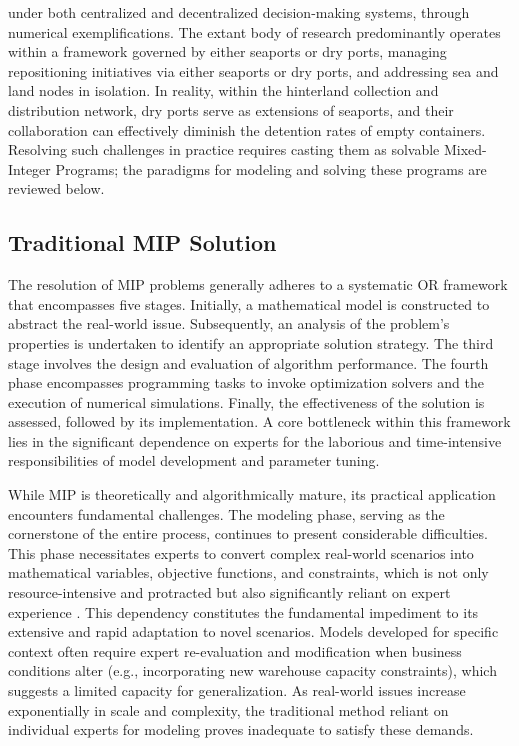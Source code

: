 \documentclass[preprint,12pt]{elsarticle}
\begin{document}
under both centralized and decentralized decision-making systems, through numerical exemplifications. The extant body of research predominantly operates within a framework governed by either seaports or dry ports, managing repositioning initiatives via either seaports or dry ports, and addressing sea and land nodes in isolation. In reality, within the hinterland collection and distribution network, dry ports serve as extensions of seaports, and their collaboration can effectively diminish the detention rates of empty containers. Resolving such challenges in practice requires casting them as solvable Mixed-Integer Programs; the paradigms for modeling and solving these programs are reviewed below.

\subsection{Traditional MIP Solution}
The resolution of MIP problems generally adheres to a systematic OR framework that encompasses five stages. Initially, a mathematical model is constructed to abstract the real-world issue. Subsequently, an analysis of the problem's properties is undertaken to identify an appropriate solution strategy. The third stage involves the design and evaluation of algorithm performance. The fourth phase encompasses programming tasks to invoke optimization solvers and the execution of numerical simulations. Finally, the effectiveness of the solution is assessed, followed by its implementation. A core bottleneck within this framework lies in the significant dependence on experts for the laborious and time-intensive responsibilities of model development and parameter tuning.

While MIP is theoretically and algorithmically mature, its practical application encounters fundamental challenges. The modeling phase, serving as the cornerstone of the entire process, continues to present considerable difficulties. This phase necessitates experts to convert complex real-world scenarios into mathematical variables, objective functions, and constraints, which is not only resource-intensive and protracted but also significantly reliant on expert experience \citep{liLargeLanguageModels2023}. This dependency constitutes the fundamental impediment to its extensive and rapid adaptation to novel scenarios. Models developed for specific context often require expert re-evaluation and modification when business conditions alter (e.g., incorporating new warehouse capacity constraints), which suggests a limited capacity for generalization. As real-world issues increase exponentially in scale and complexity, the traditional method reliant on individual experts for modeling proves inadequate to satisfy these demands.
\end{document}

